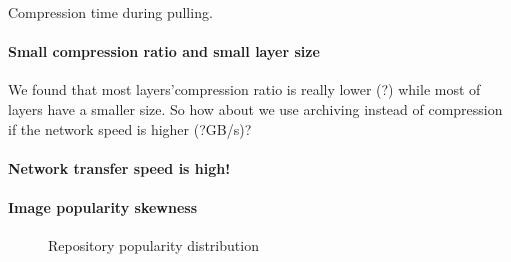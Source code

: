 Compression time during pulling. 

\paragraph{Small compression ratio and small layer size}





We found that most layers'compression ratio is really lower (?) while most of layers have a smaller size. 
So how about we use archiving instead of compression if the network speed is higher (?GB/s)?

\paragraph{Network transfer speed is high!}

\paragraph{Image popularity skewness} 

\begin{figure}[!t]
	\centering
	\caption{Repository popularity distribution}
	\label{fig-pop}
\end{figure}

